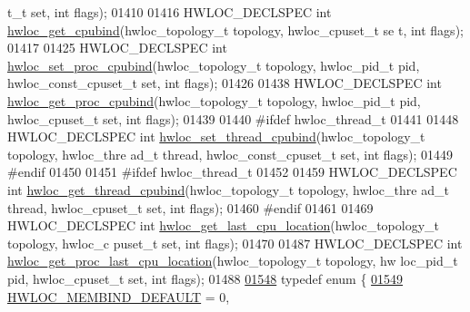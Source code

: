 \begin{DoxyCode}
      t\_t \textcolor{keyword}{set}, \textcolor{keywordtype}{int} flags);
01410 
01416 HWLOC\_DECLSPEC \textcolor{keywordtype}{int} \hyperlink{a00049_gab52f83ab16eac465da55e16bdd30df77}{hwloc_get_cpubind}(hwloc\_topology\_t topology, hwloc\_cpuset\_t \textcolor{keyword}{se
      t}, \textcolor{keywordtype}{int} flags);
01417 
01425 HWLOC\_DECLSPEC \textcolor{keywordtype}{int} \hyperlink{a00049_gac0ef3510b4e9c1273029ecf94e8c9686}{hwloc_set_proc_cpubind}(hwloc\_topology\_t topology, hwloc\_pid\_t 
      pid, hwloc\_const\_cpuset\_t \textcolor{keyword}{set}, \textcolor{keywordtype}{int} flags);
01426 
01438 HWLOC\_DECLSPEC \textcolor{keywordtype}{int} \hyperlink{a00049_gaa1373a002b9a0a87eb002e26c590f2da}{hwloc_get_proc_cpubind}(hwloc\_topology\_t topology, hwloc\_pid\_t 
      pid, hwloc\_cpuset\_t \textcolor{keyword}{set}, \textcolor{keywordtype}{int} flags);
01439 
01440 \textcolor{preprocessor}{#ifdef hwloc\_thread\_t}
01441 \textcolor{preprocessor}{}
01448 HWLOC\_DECLSPEC \textcolor{keywordtype}{int} \hyperlink{a00049_gaab65c34a0bc19c5a823f824543cedbd4}{hwloc_set_thread_cpubind}(hwloc\_topology\_t topology, hwloc\_thre
      ad\_t thread, hwloc\_const\_cpuset\_t \textcolor{keyword}{set}, \textcolor{keywordtype}{int} flags);
01449 \textcolor{preprocessor}{#endif}
01450 \textcolor{preprocessor}{}
01451 \textcolor{preprocessor}{#ifdef hwloc\_thread\_t}
01452 \textcolor{preprocessor}{}
01459 HWLOC\_DECLSPEC \textcolor{keywordtype}{int} \hyperlink{a00049_ga089cecfdb9a50e5c5cd1b6ff17352d42}{hwloc_get_thread_cpubind}(hwloc\_topology\_t topology, hwloc\_thre
      ad\_t thread, hwloc\_cpuset\_t \textcolor{keyword}{set}, \textcolor{keywordtype}{int} flags);
01460 \textcolor{preprocessor}{#endif}
01461 \textcolor{preprocessor}{}
01469 HWLOC\_DECLSPEC \textcolor{keywordtype}{int} \hyperlink{a00049_ga8e9a4b5ee3eaa18fd3a229790c6b5b17}{hwloc_get_last_cpu_location}(hwloc\_topology\_t topology, hwloc\_c
      puset\_t \textcolor{keyword}{set}, \textcolor{keywordtype}{int} flags);
01470 
01487 HWLOC\_DECLSPEC \textcolor{keywordtype}{int} \hyperlink{a00049_ga1e005ddb9701e6a993a9eb8abe67a710}{hwloc_get_proc_last_cpu_location}(hwloc\_topology\_t topology, hw
      loc\_pid\_t pid, hwloc\_cpuset\_t \textcolor{keyword}{set}, \textcolor{keywordtype}{int} flags);
01488 
\hypertarget{a00033_source_l01548}{}\hyperlink{a00050_gac9764f79505775d06407b40f5e4661e8}{01548} \textcolor{keyword}{typedef} \textcolor{keyword}{enum} \{
\hypertarget{a00033_source_l01549}{}\hyperlink{a00050_ggac9764f79505775d06407b40f5e4661e8a18675bb80ebc1bce5b652e9de8f3998c}{01549}   \hyperlink{a00050_ggac9764f79505775d06407b40f5e4661e8a18675bb80ebc1bce5b652e9de8f3998c}{HWLOC_MEMBIND_DEFAULT} =       0,      

\end{DoxyCode}
